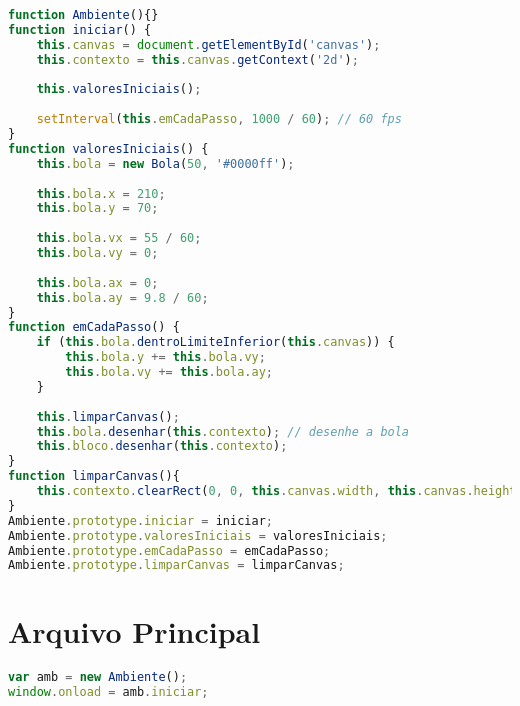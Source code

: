 \documentclass[12pt,a4paper,oneside]{article}
\begin{document}
\begin{lstlisting}[language=JavaScript]
function Ambiente(){}
function iniciar() {    
	this.canvas = document.getElementById('canvas');
	this.contexto = this.canvas.getContext('2d');
	
	this.valoresIniciais();
	
	setInterval(this.emCadaPasso, 1000 / 60); // 60 fps
}
function valoresIniciais() {
	this.bola = new Bola(50, '#0000ff');
	
	this.bola.x = 210;
	this.bola.y = 70;
	
	this.bola.vx = 55 / 60;
	this.bola.vy = 0;
	
	this.bola.ax = 0;
	this.bola.ay = 9.8 / 60;
}
function emCadaPasso() {    
	if (this.bola.dentroLimiteInferior(this.canvas)) {
		this.bola.y += this.bola.vy;
		this.bola.vy += this.bola.ay;
	} 
	
	this.limparCanvas();
	this.bola.desenhar(this.contexto); // desenhe a bola 
	this.bloco.desenhar(this.contexto);
}
function limparCanvas(){
	this.contexto.clearRect(0, 0, this.canvas.width, this.canvas.height);
}
Ambiente.prototype.iniciar = iniciar;
Ambiente.prototype.valoresIniciais = valoresIniciais;
Ambiente.prototype.emCadaPasso = emCadaPasso;
Ambiente.prototype.limparCanvas = limparCanvas;
\end{lstlisting}

\section*{Arquivo Principal}

\begin{lstlisting}[language=JavaScript]
var amb = new Ambiente();
window.onload = amb.iniciar;
\end{lstlisting}
\end{document}
